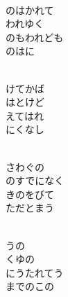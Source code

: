 \documentclass[10pt,b5j]{tarticle} %
\begin{document}
\vspace{1.5em} %
\newcommand{\linespace}{0.5em} %
\newcommand{\blocksize}{0.5\hsize} %
\newcommand{\itemmargin}{6em} %
\begin{enumerate} %
    \setlength{\itemindent}{\itemmargin} %
    \begin{minipage}[c]{\blocksize}
    
        \vspace{\linespace}
        \item~\\
        のはかれて\\
        われゆく\\
        のもわれども\\
        のはに
        
        \vspace{\linespace}
        \item~\\
        けてかば\\
        はとけど\\
        えてはれ\\
        にくなし
        
        \vspace{\linespace}
        \item~\\
        さわぐの\\
        のすでになく\\
        きのをびて\\
        ただとまう
        
        \vspace{\linespace}
        \item~\\
        うの\\
        くゆの\\
        にうたれてう\\
        までのこの
        

\end{minipage}
\end{enumerate}
\end{document}
